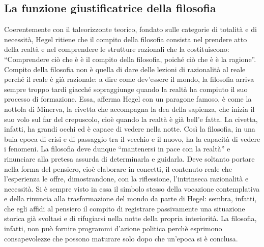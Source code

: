 \documentclass[a4paper,12pt,oneside,openany]{book}%
\begin{document}
\subsection*{La funzione giustificatrice della filosofia}

Coerentemente con il taleorizzonte teorico, fondato sulle categorie di totalità e di necessità, Hegel ritiene che il compito della filosofia consista nel prendere atto della realtà e nel comprendere le strutture razionali che la costituiscono: “Comprendere ciò che è è il compito della filosofia, poiché ciò che è è la ragione”. Compito della filosofia non è quella di dare delle lezioni di razionalità al reale perché il reale è già razionale: a dire come dev’essere il mondo, la filosofia arriva sempre troppo tardi giacché sopraggiunge quando la realtà ha compiuto il suo processo di formazione. Essa, afferma Hegel con un paragone famoso, è come la nottola di Minerva, la civetta che accompagna la dea della sapienza, che inizia il suo volo sul far del cre­puscolo, cioè quando la realtà è già bell’e fatta. La civetta, infatti, ha grandi occhi ed è capace di vedere nella notte. Così la filosofia, in una buia epoca di crisi e di passaggio tra il vecchio e il nuovo, ha la capacità di vedere i fenomeni. La filosofia deve dunque “mantener­si in pace con la realtà” e rinunciare alla pretesa assurda di determinarla e guidarla. Deve soltanto portare nella forma del pensiero, cioè elaborare in concetti, il conte­nuto reale che l’esperienza le offre, dimostrandone, con la riflessione, l’intrinseca razionalità e necessità. Si è sempre visto in essa il simbolo stesso della vocazione contemplativa e della rinuncia alla trasformazione del mondo da parte di Hegel: sembra, infatti, che egli affidi al pensiero il compito di registrare passivamente una situazione storica già svoltasi e di rifugiarsi nella notte della propria interiorità. La filosofia, infatti, non può fornire programmi d’azione politica perchè esprimono consapevolezze che possono maturare solo dopo che un’epoca si è conclusa.
\end{document}
